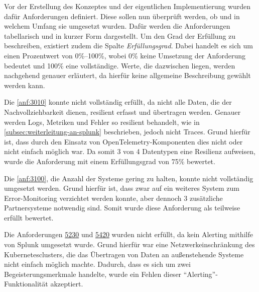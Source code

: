 
Vor der Erstellung des Konzeptes und der eigentlichen Implementierung wurden dafür Anforderungen definiert. Diese sollen nun überprüft werden, ob und in welchem Umfang sie umgesetzt wurden. Dafür werden die Anforderungen tabellarisch und in kurzer Form dargestellt. Um den Grad der Erfüllung zu beschreiben, existiert zudem die Spalte \textit{Erfüllungsgrad}. Dabei handelt es sich um einen Prozentwert von 0\%--100\%, wobei 0\% keine Umsetzung der Anforderung bedeutet und 100\% eine vollständige. Werte, die dazwischen liegen, werden nachgehend genauer erläutert, da hierfür keine allgemeine Beschreibung gewählt werden kann.
	


Die \autoref{anf:3010} konnte nicht vollständig erfüllt, da nicht alle Daten, die der Nachvollziehbarkeit dienen, resilient erfasst und übertragen werden. Genauer werden Logs, Metriken und Fehler so resilient behandelt, wie in \autoref{subsec:weiterleitung-an-splunk} beschrieben, jedoch nicht Traces. Grund hierfür ist, dass durch den Einsatz von OpenTelemetry-Komponenten dies nicht oder nicht einfach möglich war. Da somit 3 von 4 Datentypen eine Resilienz aufweisen, wurde die Anforderung mit einem Erfüllungsgrad von 75\% bewertet.

Die \autoref{anf:3100}, die Anzahl der Systeme gering zu halten, konnte nicht vollständig umgesetzt werden. Grund hierfür ist, dass zwar auf ein weiteres System zum Error-Monitoring verzichtet werden konnte, aber dennoch 3 zusätzliche Partnersysteme notwendig sind. Somit wurde diese Anforderung als teilweise erfüllt bewertet.

Die Anforderungen \hyperref[anf:5230]{5230} und \hyperref[anf:5420]{5420} wurden nicht erfüllt, da kein Alerting mithilfe von Splunk umgesetzt wurde. Grund hierfür war eine Netzwerkeinschränkung des Kuber\-netes\-clusters, die das Übertragen von Daten an außenstehende Systeme nicht einfach möglich machte. Dadurch, dass es sich um zwei Begeisterungsmerkmale handelte, wurde ein Fehlen dieser \enquote{Alerting}-Funktionalität akzeptiert.